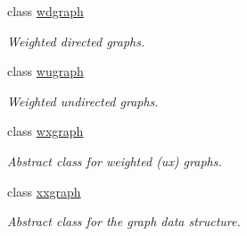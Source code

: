 \begin{DoxyCompactItemize}
class \hyperlink{classlgraph_1_1utils_1_1wdgraph}{wdgraph}
\begin{DoxyCompactList}\small\item\em Weighted directed graphs. \end{DoxyCompactList}\item 
class \hyperlink{classlgraph_1_1utils_1_1wugraph}{wugraph}
\begin{DoxyCompactList}\small\item\em Weighted undirected graphs. \end{DoxyCompactList}\item 
class \hyperlink{classlgraph_1_1utils_1_1wxgraph}{wxgraph}
\begin{DoxyCompactList}\small\item\em Abstract class for weighted (ux) graphs. \end{DoxyCompactList}\item 
class \hyperlink{classlgraph_1_1utils_1_1xxgraph}{xxgraph}
\begin{DoxyCompactList}\small\item\em Abstract class for the graph data structure. \end{DoxyCompactList}\end{DoxyCompactItemize}
